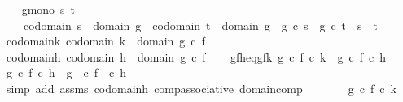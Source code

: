 \begin{isabellebody}
\ \ \isamarkupfalse%
\ g{\isacharunderscore}{\kern0pt}mono{\isacharcolon}{\kern0pt}\ {\isachardoublequoteopen}{\isasymforall}s{\isachardot}{\kern0pt}\ {\isasymforall}t{\isachardot}{\kern0pt}\ \isanewline
\ \ \ \ codomain\ s\ {\isacharequal}{\kern0pt}\ domain\ g\ {\isasymand}\ codomain\ t\ {\isacharequal}{\kern0pt}\ domain\ g\ {\isasymlongrightarrow}\ g\ {\isasymcirc}\isactrlsub c\ s\ {\isacharequal}{\kern0pt}\ g\ {\isasymcirc}\isactrlsub c\ t\ {\isasymlongrightarrow}\ s\ {\isacharequal}{\kern0pt}\ t{\isachardoublequoteclose}\isanewline
\ \ \isamarkupfalse%
\ codomain{\isacharunderscore}{\kern0pt}k{\isacharcolon}{\kern0pt}\ {\isachardoublequoteopen}codomain\ k\ {\isacharequal}{\kern0pt}\ domain\ {\isacharparenleft}{\kern0pt}g\ {\isasymcirc}\isactrlsub c\ f{\isacharparenright}{\kern0pt}{\isachardoublequoteclose}\isanewline
\ \ \isamarkupfalse%
\ codomain{\isacharunderscore}{\kern0pt}h{\isacharcolon}{\kern0pt}\ {\isachardoublequoteopen}codomain\ h\ {\isacharequal}{\kern0pt}\ domain\ {\isacharparenleft}{\kern0pt}g\ {\isasymcirc}\isactrlsub c\ f{\isacharparenright}{\kern0pt}{\isachardoublequoteclose}\isanewline
\ \ \isamarkupfalse%
\ gfh{\isacharunderscore}{\kern0pt}eq{\isacharunderscore}{\kern0pt}gfk{\isacharcolon}{\kern0pt}\ {\isachardoublequoteopen}{\isacharparenleft}{\kern0pt}g\ {\isasymcirc}\isactrlsub c\ f{\isacharparenright}{\kern0pt}\ {\isasymcirc}\isactrlsub c\ k\ {\isacharequal}{\kern0pt}\ {\isacharparenleft}{\kern0pt}g\ {\isasymcirc}\isactrlsub c\ f{\isacharparenright}{\kern0pt}\ {\isasymcirc}\isactrlsub c\ h{\isachardoublequoteclose}\isanewline
\ \isanewline
\ \ \isamarkupfalse%
\ {\isachardoublequoteopen}g\ {\isasymcirc}\isactrlsub c\ {\isacharparenleft}{\kern0pt}f\ {\isasymcirc}\isactrlsub c\ h{\isacharparenright}{\kern0pt}\ {\isacharequal}{\kern0pt}\ {\isacharparenleft}{\kern0pt}g\ \ {\isasymcirc}\isactrlsub c\ f{\isacharparenright}{\kern0pt}\ \ {\isasymcirc}\isactrlsub c\ h{\isachardoublequoteclose}\isanewline
\ \ \ \ \isamarkupfalse%
\ {\isacharparenleft}{\kern0pt}simp\ add{\isacharcolon}{\kern0pt}\ assms\ codomain{\isacharunderscore}{\kern0pt}h\ comp{\isacharunderscore}{\kern0pt}associative\ domain{\isacharunderscore}{\kern0pt}comp{\isacharparenright}{\kern0pt}\isanewline
\ \ \isamarkupfalse%
\ \isamarkupfalse%
\ {\isachardoublequoteopen}{\isachardot}{\kern0pt}{\isachardot}{\kern0pt}{\isachardot}{\kern0pt}\ {\isacharequal}{\kern0pt}\ {\isacharparenleft}{\kern0pt}g\ {\isasymcirc}\isactrlsub c\ f{\isacharparenright}{\kern0pt}\ {\isasymcirc}\isactrlsub c\ k{\isachardoublequoteclose}\isanewline

\end{isabellebody}
